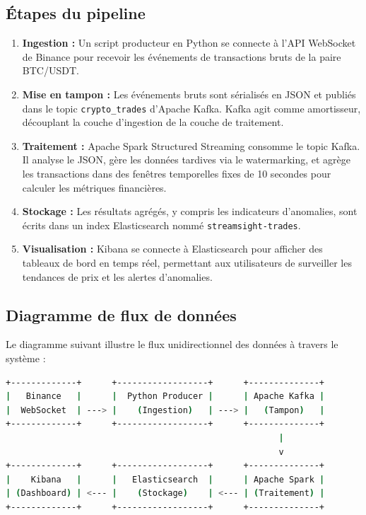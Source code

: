 \documentclass[12pt, a4paper]{article}
\begin{document}
\subsection{\'Etapes du pipeline}
\begin{enumerate}
    \item \textbf{Ingestion :} Un script producteur en Python se connecte \`a l'API WebSocket de Binance pour recevoir les \'ev\'enements de transactions bruts de la paire BTC/USDT.
    \item \textbf{Mise en tampon :} Les \'ev\'enements bruts sont s\'erialis\'es en JSON et publi\'es dans le topic \texttt{crypto\_trades} d'Apache Kafka. Kafka agit comme amortisseur, d\'ecouplant la couche d'ingestion de la couche de traitement.
    \item \textbf{Traitement :} Apache Spark Structured Streaming consomme le topic Kafka. Il analyse le JSON, g\`ere les donn\'ees tardives via le watermarking, et agr\`ege les transactions dans des fen\^etres temporelles fixes de 10 secondes pour calculer les m\'etriques financi\`eres.
    \item \textbf{Stockage :} Les r\'esultats agr\'eg\'es, y compris les indicateurs d'anomalies, sont \'ecrits dans un index Elasticsearch nomm\'e \texttt{streamsight-trades}.
    \item \textbf{Visualisation :} Kibana se connecte \`a Elasticsearch pour afficher des tableaux de bord en temps r\'eel, permettant aux utilisateurs de surveiller les tendances de prix et les alertes d'anomalies.
\end{enumerate}

\subsection{Diagramme de flux de donn\'ees}
Le diagramme suivant illustre le flux unidirectionnel des donn\'ees \`a travers le syst\`eme :

\begin{lstlisting}[language=bash, caption=Flux de donn\'ees de bout en bout de STREAMSIGHT]
+-------------+      +------------------+      +--------------+
|   Binance   |      |  Python Producer |      | Apache Kafka |
|  WebSocket  | ---> |    (Ingestion)   | ---> |   (Tampon)   |
+-------------+      +------------------+      +--------------+
                                                      |
                                                      v
+-------------+      +------------------+      +--------------+
|    Kibana   |      |   Elasticsearch  |      | Apache Spark |
| (Dashboard) | <--- |    (Stockage)    | <--- | (Traitement) |
+-------------+      +------------------+      +--------------+
\end{lstlisting}
\end{document}
